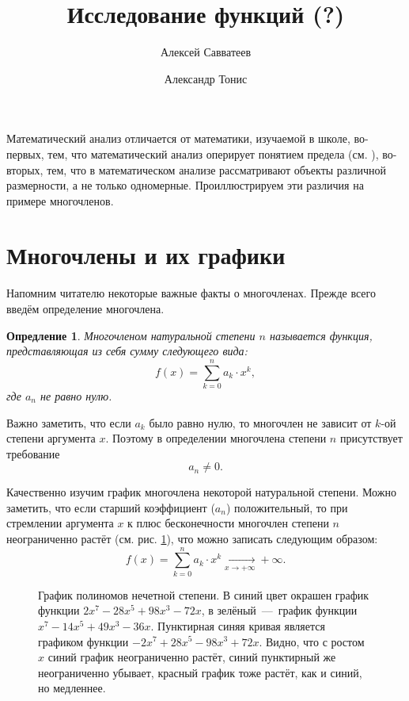 \documentclass[12pt]{article}
\title{Исследование функций (?)}
\author{Алексей Савватеев \and Александр Тонис}
\newtheorem{definition}{Опредление}[section]
\begin{document}
\maketitle
Математический анализ отличается от математики, изучаемой в школе, во\--первых, тем, что математический анализ оперирует понятием предела (см. \cite{lim_use}), во\--вторых, тем, что в математическом анализе рассматривают объекты различной размерности, а не только одномерные. Проиллюстрируем эти различия на примере многочленов.
\section{Многочлены и их графики}
Напомним читателю некоторые важные факты о многочленах. Прежде всего введём определение многочлена.
\begin{definition}
	Многочленом натуральной степени $n$ называется функция, представляющая из себя сумму следующего вида:
	\begin{equation}
	f(x) = \sum_{k=0}^n{a_k \cdot x^k},
	\end{equation}
	где $a_n$ не равно нулю.
\end{definition}
Важно заметить, что если $a_k$ было равно нулю, то многочлен не зависит от $k$\--ой степени аргумента $x$. Поэтому в определении многочлена степени $n$ присутствует требование
\begin{equation}
a_n \ne 0.
\end{equation}
\par
Качественно изучим график многочлена некоторой натуральной степени. Можно заметить, что если старший коэффициент ($a_n$) положительный, то при стремлении аргумента $x$ к плюс бесконечности многочлен степени $n$ неограниченно растёт (см. рис. \ref{fig:1}), что можно записать следующим образом:
\begin{equation}
f(x) = \sum_{k=0}^n{a_k \cdot x^k} \underset{x\rightarrow+\infty}{\longrightarrow}+\infty.
\end{equation}
\begin{figure}[htbp]
  \label{fig:1}
	\centering
	\caption{График полиномов нечетной степени. В синий цвет окрашен график функции $2x^{7} - 28 x^{5} + 98 x^{3} - 72 x$, в зелёный~\----~график функции $x^{7} - 14 x^{5} + 49 x^{3} - 36 x$. Пунктирная синяя кривая является графиком функции $-2x^{7} + 28 x^{5} -98 x^{3} + 72 x$. Видно, что с ростом $x$ синий график неограниченно растёт, синий пунктирный же неограниченно убывает, красный график тоже растёт, как и синий, но медленнее.}
\end{figure}
\end{document}
